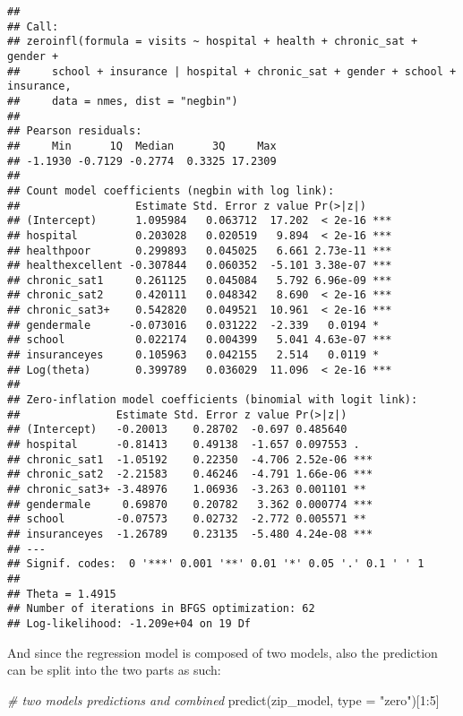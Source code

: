 \documentclass[
  oneside]{book}
\newenvironment{Shaded}{\begin{snugshade}}{\end{snugshade}}
\newcommand{\AttributeTok}[1]{\textcolor[rgb]{0.77,0.63,0.00}{#1}}
\newcommand{\CommentTok}[1]{\textcolor[rgb]{0.56,0.35,0.01}{\textit{#1}}}
\newcommand{\DecValTok}[1]{\textcolor[rgb]{0.00,0.00,0.81}{#1}}
\newcommand{\FunctionTok}[1]{\textcolor[rgb]{0.00,0.00,0.00}{#1}}
\newcommand{\NormalTok}[1]{#1}
\newcommand{\SpecialCharTok}[1]{\textcolor[rgb]{0.00,0.00,0.00}{#1}}
\newcommand{\StringTok}[1]{\textcolor[rgb]{0.31,0.60,0.02}{#1}}
\begin{document}
\begin{verbatim}
## 
## Call:
## zeroinfl(formula = visits ~ hospital + health + chronic_sat + gender + 
##     school + insurance | hospital + chronic_sat + gender + school + insurance, 
##     data = nmes, dist = "negbin")
## 
## Pearson residuals:
##     Min      1Q  Median      3Q     Max 
## -1.1930 -0.7129 -0.2774  0.3325 17.2309 
## 
## Count model coefficients (negbin with log link):
##                  Estimate Std. Error z value Pr(>|z|)    
## (Intercept)      1.095984   0.063712  17.202  < 2e-16 ***
## hospital         0.203028   0.020519   9.894  < 2e-16 ***
## healthpoor       0.299893   0.045025   6.661 2.73e-11 ***
## healthexcellent -0.307844   0.060352  -5.101 3.38e-07 ***
## chronic_sat1     0.261125   0.045084   5.792 6.96e-09 ***
## chronic_sat2     0.420111   0.048342   8.690  < 2e-16 ***
## chronic_sat3+    0.542820   0.049521  10.961  < 2e-16 ***
## gendermale      -0.073016   0.031222  -2.339   0.0194 *  
## school           0.022174   0.004399   5.041 4.63e-07 ***
## insuranceyes     0.105963   0.042155   2.514   0.0119 *  
## Log(theta)       0.399789   0.036029  11.096  < 2e-16 ***
## 
## Zero-inflation model coefficients (binomial with logit link):
##               Estimate Std. Error z value Pr(>|z|)    
## (Intercept)   -0.20013    0.28702  -0.697 0.485640    
## hospital      -0.81413    0.49138  -1.657 0.097553 .  
## chronic_sat1  -1.05192    0.22350  -4.706 2.52e-06 ***
## chronic_sat2  -2.21583    0.46246  -4.791 1.66e-06 ***
## chronic_sat3+ -3.48976    1.06936  -3.263 0.001101 ** 
## gendermale     0.69870    0.20782   3.362 0.000774 ***
## school        -0.07573    0.02732  -2.772 0.005571 ** 
## insuranceyes  -1.26789    0.23135  -5.480 4.24e-08 ***
## ---
## Signif. codes:  0 '***' 0.001 '**' 0.01 '*' 0.05 '.' 0.1 ' ' 1 
## 
## Theta = 1.4915 
## Number of iterations in BFGS optimization: 62 
## Log-likelihood: -1.209e+04 on 19 Df
\end{verbatim}

And since the regression model is composed of two models, also the
prediction can be split into the two parts as such:

\begin{Shaded}
\begin{Highlighting}[]
\CommentTok{\# two models predictions and combined}
\FunctionTok{predict}\NormalTok{(zip\_model, }\AttributeTok{type =} \StringTok{"zero"}\NormalTok{)[}\DecValTok{1}\SpecialCharTok{:}\DecValTok{5}\NormalTok{]}
\end{Highlighting}
\end{Shaded}
\end{document}
